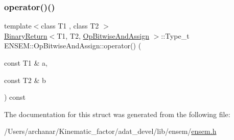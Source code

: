 \mbox{\label{structENSEM_1_1OpBitwiseAndAssign_aeae291f2a2bdeac95b1d751d6d94b77d}} 
\subsubsection{\texorpdfstring{operator()()}{operator()()}\hspace{0.1cm}{\footnotesize\ttfamily [2/2]}}
{\footnotesize\ttfamily template$<$class T1 , class T2 $>$ \\
\mbox{\hyperlink{structENSEM_1_1BinaryReturn}{Binary\+Return}}$<$T1, T2, \mbox{\hyperlink{structENSEM_1_1OpBitwiseAndAssign}{Op\+Bitwise\+And\+Assign}} $>$\+::Type\+\_\+t E\+N\+S\+E\+M\+::\+Op\+Bitwise\+And\+Assign\+::operator() (\begin{DoxyParamCaption}\item[{const T1 \&}]{a,  }\item[{const T2 \&}]{b }\end{DoxyParamCaption}) const\hspace{0.3cm}{\ttfamily [inline]}}



The documentation for this struct was generated from the following file\+:\begin{DoxyCompactItemize}
\item 
/\+Users/archanar/\+Kinematic\+\_\+factor/adat\+\_\+devel/lib/ensem/\mbox{\hyperlink{lib_2ensem_2ensem_8h}{ensem.\+h}}\end{DoxyCompactItemize}
